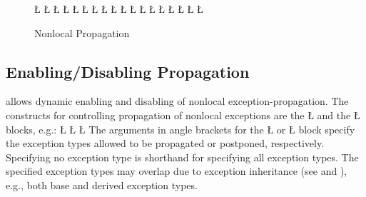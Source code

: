 \documentclass[openright,twoside]{report}
\begin{document}
\begin{figure}[htb]
\LGinlinefalse\LGbegin\lgrinde
\L{}
\L{}
\L{\LB{}}
\L{\LB{}}
\L{\LB{}}
\CE{}\L{\LB{}}
\L{\LB{}}
\CE{}\L{\LB{}}
\L{\LB{}}
\L{}
\L{}
\CE{}\L{\LB{}}
\L{\LB{\};}}
\L{}
\L{\LB{}}
\L{\LB{}}
\CE{}\L{\LB{}}
\CE{}\L{\LB{\}}}
\endlgrinde\LGend
\vspace{-4mm}
\caption{Nonlocal Propagation}
\label{f:NonlocalPropagation}
\end{figure}


\subsection{Enabling/Disabling Propagation}
\label{s:EnablingDisablingPropagation}

\uC allows dynamic enabling and disabling of nonlocal exception-propagation.
The constructs for controlling propagation of nonlocal exceptions are the \LGinlinetrue\LGbegin\lgrinde\L{}\endlgrinde\LGend{} and the \LGinlinetrue\LGbegin\lgrinde\L{}\endlgrinde\LGend{} blocks, e.g.:
\LGinlinefalse\LGbegin\lgrinde
\L{}
\L{\LB{}}
\CE{}\L{\LB{\}}}
\endlgrinde\LGend
The arguments in angle brackets for the \LGinlinetrue\LGbegin\lgrinde\L{}\endlgrinde\LGend{} or \LGinlinetrue\LGbegin\lgrinde\L{}\endlgrinde\LGend{} block specify the exception types allowed to be propagated or postponed, respectively.
Specifying no exception type is shorthand for specifying all exception types.
The specified exception types may overlap due to exception inheritance (see  and ), e.g., both base and derived exception types.
\end{document}
